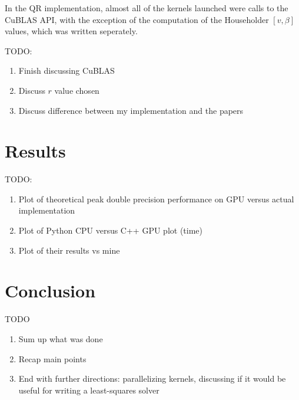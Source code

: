 \documentclass[12pt]{article}
\begin{document}
In the QR implementation, almost all of the kernels launched were calls to the CuBLAS API,
with the exception of the computation of the Householder $[v, \beta]$ values, which was 
written seperately.
\par\null\par
TODO:
\begin{enumerate}
    \item Finish discussing CuBLAS
    \item Discuss $r$ value chosen
    \item Discuss difference between my implementation and the papers
\end{enumerate}

\section*{Results}
\par\null\par
TODO:
\begin{enumerate}
    \item Plot of theoretical peak double precision performance on GPU versus
        actual implementation
    \item Plot of Python CPU versus C++ GPU plot (time)
    \item Plot of their results vs  mine
\end{enumerate}

\section*{Conclusion}
\par\null\par
TODO
\begin{enumerate}
    \item Sum up what was done
    \item Recap main points
    \item End with further directions: parallelizing kernels, discussing if it would
        be useful for writing a least-squares solver
\end{enumerate}



\end{document}

